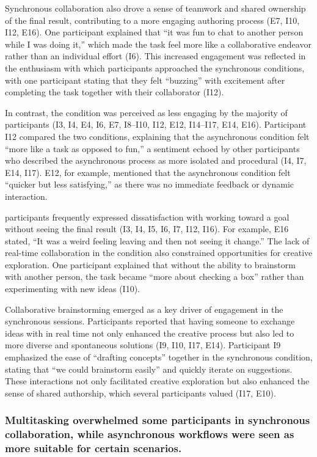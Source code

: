 Synchronous collaboration also drove a sense of teamwork and shared ownership of the final result, contributing to a more engaging authoring process (E7, I10, I12, E16). 
One participant explained that ``it was fun to chat to another person while I was doing it,'' which made the task feel more like a collaborative endeavor rather than an individual effort (I6). This increased engagement was reflected in the enthusiasm with which participants approached the synchronous conditions, with one participant stating that they felt ``buzzing'' with excitement after completing the task together with their collaborator (I12).

In contrast, the \async condition was perceived as less engaging by the majority of participants (I3, I4, E4, I6, E7, I8–I10, I12, E12, I14–I17, E14, E16). 
Participant I12 compared the two conditions, explaining that the asynchronous condition felt ``more like a task as opposed to fun,'' a sentiment echoed by other participants who described the asynchronous process as more isolated and procedural (I4, I7, E14, I17). E12, for example, mentioned that the asynchronous condition felt ``quicker but less satisfying,'' as there was no immediate feedback or dynamic interaction. 

\Insitu participants frequently expressed dissatisfaction with working toward a goal without seeing the final result (I3, I4, I5, I6, I7, I12, I16). 
For example, E16 stated, ``It was a weird feeling leaving and then not seeing it change.'' The lack of real-time collaboration in the \async condition also constrained opportunities for creative exploration. One participant explained that without the ability to brainstorm with another person, the task became ``more about checking a box'' rather than experimenting with new ideas (I10).

Collaborative brainstorming emerged as a key driver of engagement in the synchronous sessions. Participants reported that having someone to exchange ideas with in real time not only enhanced the creative process but also led to more diverse and spontaneous solutions (I9, I10, I17, E14). Participant I9 emphasized the ease of ``drafting concepts'' together in the synchronous condition, stating that ``we could brainstorm easily'' and quickly iterate on suggestions. 
These interactions not only facilitated creative exploration but also enhanced the sense of shared authorship, which several participants valued (I17, E10).

\subsubsection{\textbf{Multitasking overwhelmed some participants in synchronous collaboration, while asynchronous workflows were seen as more suitable for certain scenarios.}}\label{sec:results:interviews:mult-tasking}

